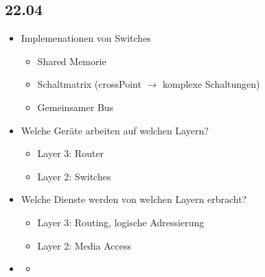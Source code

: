 \documentclass{article} %
\begin{document}
\subsection{22.04}
	\begin{itemize}
		\item Implemenationen von Switches
			\begin{itemize}
				\item Shared Memorie
				\item Schaltmatrix (crossPoint $\rightarrow$ komplexe Schaltungen)
				\item Gemeinsamer Bus
			\end{itemize}
		\item Welche Geräte arbeiten auf welchen Layern?
			\begin{itemize}
				\item Layer 3: Router
				\item Layer 2: Switches
			\end{itemize}		
		\item Welche Dienste werden von welchen Layern erbracht?
			\begin{itemize}
				\item Layer 3: Routing, logische Adressierung
				\item Layer 2: Media Access
			\end{itemize}
		\item 
			\begin{itemize}
				\item 
			\end{itemize}
	\end{itemize}
\end{document}
